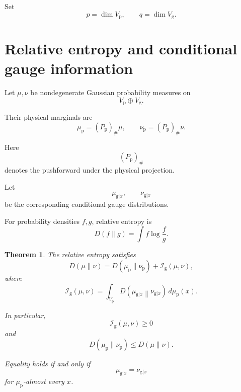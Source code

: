 \documentclass[11pt]{article}
\newtheorem{theorem}{Theorem}
\theoremstyle{remark}
\begin{document}
Set
\begin{equation}
p=\dim V_{\mathrm p},
\qquad
q=\dim V_{\mathrm g}.
\label{eq:dimensions}
\end{equation}

\section{Relative entropy and conditional gauge information}

Let \(\mu,\nu\) be nondegenerate Gaussian probability measures
on
\begin{equation}
V_{\mathrm p}\oplus V_{\mathrm g}.
\end{equation}

Their physical marginals are
\begin{equation}
\mu_{\mathrm p}
=
(P_{\mathrm p})_\#\mu,
\qquad
\nu_{\mathrm p}
=
(P_{\mathrm p})_\#\nu.
\label{eq:marginals}
\end{equation}

Here
\begin{equation}
(P_{\mathrm p})_\#
\end{equation}
denotes the pushforward under the physical projection.

Let
\begin{equation}
\mu_{\mathrm g|x},
\qquad
\nu_{\mathrm g|x}
\end{equation}
be the corresponding conditional gauge distributions.

For probability densities \(f,g\), relative entropy is
\begin{equation}
D(f\|g)
=
\int
f\log\frac{f}{g}.
\label{eq:relative}
\end{equation}

\begin{theorem}
\label{thm:chain}
The relative entropy satisfies
\begin{equation}
D(\mu\|\nu)
=
D(\mu_{\mathrm p}\|\nu_{\mathrm p})
+
\mathcal I_{\mathrm g}(\mu,\nu),
\label{eq:chain}
\end{equation}
where
\begin{equation}
\mathcal I_{\mathrm g}(\mu,\nu)
=
\int_{V_{\mathrm p}}
D\left(
\mu_{\mathrm g|x}
\middle\|
\nu_{\mathrm g|x}
\right)
\,d\mu_{\mathrm p}(x).
\label{eq:gauge-information}
\end{equation}

In particular,
\begin{equation}
\mathcal I_{\mathrm g}(\mu,\nu)\geq0
\label{eq:nonnegative}
\end{equation}
and
\begin{equation}
D(\mu_{\mathrm p}\|\nu_{\mathrm p})
\leq
D(\mu\|\nu).
\label{eq:contraction}
\end{equation}

Equality holds if and only if
\begin{equation}
\mu_{\mathrm g|x}
=
\nu_{\mathrm g|x}
\label{eq:conditional-equality}
\end{equation}
for \(\mu_{\mathrm p}\)-almost every \(x\).
\end{theorem}
\end{document}
